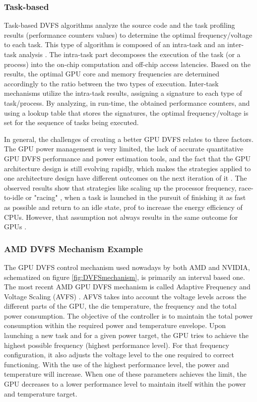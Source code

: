 \subsubsection{Task-based}

Task-based DVFS algorithms analyze the source code and the task profiling results (performance counters values) to determine the optimal frequency/voltage to each task. This type of algorithm is composed of an intra-task and an inter-task analysis \cite{noauthor_time_nodate}. The intra-task part decomposes the execution of the task (or a process) into the on-chip computation and off-chip access latencies. Based on the results,  the optimal GPU core and memory frequencies are determined accordingly to the ratio between the two types of execution. Inter-task mechanisms utilize the intra-task results, assigning a signature to each type of task/process. By analyzing, in run-time, the obtained performance counters, and using a lookup table that stores the signatures, the optimal frequency/voltage is set for the sequence of tasks being executed.


\bigskip
In general, the challenges of creating a better GPU DVFS relates to three factors. The GPU power management is very limited, the lack of accurate quantitative GPU DVFS performance and power estimation tools, and the fact that the GPU architecture design is still evolving rapidly, which makes the strategies applied to one architecture design have different outcomes on the next iteration of it \cite{mei_survey_2016}. The observed results show that strategies like scaling up the processor frequency, race-to-idle  \cite{hoffmann_racing_2013} or "racing" \cite{kim_racing_2015}, when a task is launched in the pursuit of finishing it as fast as possible and return to an idle state, prof to increase the energy efficiency of CPUs. However, that assumption not always results in the same outcome for GPUs \cite{kim_racing_2015}. 

\subsubsection{AMD DVFS Mechanism Example}

The GPU DVFS control mechanism used nowadays by both AMD and NVIDIA, schematized on figure \ref{fig:DVFSmechanism}, is primarily an interval based one. The most recent AMD GPU DVFS mechanism is called Adaptive Frequency and Voltage Scaling (AVFS) \cite{amd_polaris_2017}. AFVS takes into account the voltage levels across the different parts of the GPU, the die temperature, the frequency and the total power consumption. The objective of the controller is to maintain the total power consumption within the required power and temperature envelope. Upon launching a new task and for a given power target, the GPU tries to achieve the highest possible frequency (highest performance level). For that frequency configuration, it also adjusts the voltage level to the one required to correct functioning. With the use of the highest performance level, the power and temperature will increase. When one of these parameters achieves the limit, the GPU decreases to a lower performance level to maintain itself within the power and temperature target. 

